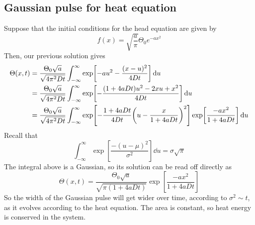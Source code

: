 \documentclass[a4paper]{article}
\begin{document}
\subsection{Gaussian pulse for heat equation}
Suppose that the initial conditions for the head equation are given by
\[
	f(x) = \sqrt{\frac{a}{\pi}} \Theta_0 e^{-ax^2}
\]
Then, our previous solution gives
\begin{align*}
	\Theta(x,t) & = \frac{\Theta_0 \sqrt{a}}{\sqrt{4 \pi^2 D t}} \int_{-\infty}^\infty \exp[-au^2 - \frac{(x-u)^2}{4 D t}] \dd{u}                                                      \\
	            & = \frac{\Theta_0 \sqrt{a}}{\sqrt{4 \pi^2 D t}} \int_{-\infty}^\infty \exp[-\frac{(1 + 4 a D t)u^2 - 2xu + x^2}{4 D t}] \dd{u}                                        \\
	            & = \frac{\Theta_0 \sqrt{a}}{\sqrt{4 \pi^2 D t}} \int_{-\infty}^\infty \exp[-\frac{1 + 4 a D t}{4 D t} \qty(u - \frac{x}{1+4aDt})^2 ] \exp[ \frac{-ax^2}{1+4aDt}] \dd{u}
\end{align*}
Recall that
\[
	\int_{-\infty}^\infty \exp[\frac{-(u - \mu)^2}{\sigma^2}] \dd{u} = \sigma \sqrt{\pi}
\]
The integral above is a Gaussian, so its solution can be read off directly as
\[
	\Theta(x,t) = \frac{\Theta_0 \sqrt{a}}{\sqrt{\pi (1 + 4 a D t)}} \exp[\frac{-ax^2}{1+4aDt}]
\]
So the width of the Gaussian pulse will get wider over time, according to \( \sigma^2 \sim t \), as it evolves according to the heat equation.
The area is constant, so heat energy is conserved in the system.
\end{document}

